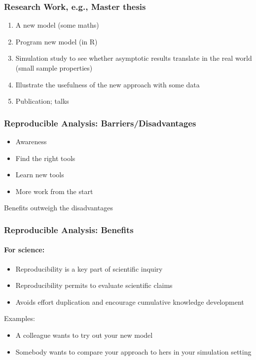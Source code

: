 \documentclass[paper=screen,mathserif]{beamer}\usepackage[]{graphicx}\usepackage[]{color}
\begin{document}
\begin{frame}
  \frametitle{Research Work, e.g., Master thesis}
  \begin{enumerate}
  \item A new model (some maths)
  \item Program new model (in R)
  \item Simulation study to see whether asymptotic results translate
    in the real world (small sample properties)
  \item Illustrate the usefulness of the new approach with some data
  \item Publication; talks
  \end{enumerate}
\end{frame}

\begin{frame}
  \frametitle{Reproducible Analysis: Barriers/Disadvantages}
  \begin{itemize}
  \item Awareness
  \item Find the right tools
  \item Learn new tools
  \item More work from the start
  \end{itemize}
  \pause\vspace{0.6cm}
  Benefits outweigh the disadvantages  
\end{frame}

\begin{frame}
  \frametitle{Reproducible Analysis: Benefits}
  \framesubtitle{For science:}
\begin{itemize}
\item Reproducibility is a key part of scientific inquiry
\item Reproducibility permits to evaluate scientific claims
\item Avoids effort duplication and encourage cumulative knowledge
  development
\end{itemize}
Examples:
\begin{itemize}
\item A colleague wants to try out your new model
\item Somebody wants to compare your approach to hers in your
  simulation setting 
\end{itemize}
\end{frame}
\end{document}
